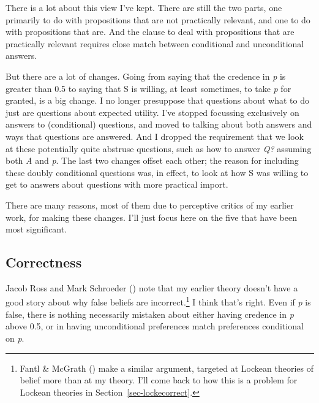 \documentclass[
  12pt,
  letterpaper,
]{scrbook}
\begin{document}
There is a lot about this view I've kept. There are still the two parts,
one primarily to do with propositions that are not practically relevant,
and one to do with propositions that are. And the clause to deal with
propositions that are practically relevant requires close match between
conditional and unconditional answers.

But there are a lot of changes. Going from saying that the credence in
\emph{p} is greater than 0.5 to saying that S is willing, at least
sometimes, to take \emph{p} for granted, is a big change. I no longer
presuppose that questions about what to do just are questions about
expected utility. I've stopped focussing exclusively on answers to
(conditional) questions, and moved to talking about both answers and
ways that questions are answered. And I dropped the requirement that we
look at these potentially quite abstruse questions, such as how to
answer \emph{Q?} assuming both \emph{A} and \emph{p}. The last two
changes offset each other; the reason for including these doubly
conditional questions was, in effect, to look at how S was willing to
get to answers about questions with more practical import.

There are many reasons, most of them due to perceptive critics of my
earlier work, for making these changes. I'll just focus here on the five
that have been most significant.

\subsection{Correctness}\label{sec-mecorrect}

Jacob Ross and Mark Schroeder ()
note that my earlier theory doesn't have a good story about why false
beliefs are incorrect.\footnote{Fantl \& McGrath
  () make a similar argument,
  targeted at Lockean theories of belief more than at my theory. I'll
  come back to how this is a problem for Lockean theories in
  Section~\ref{sec-lockecorrect}.} I think that's right. Even if
\emph{p} is false, there is nothing necessarily mistaken about either
having credence in \emph{p} above 0.5, or in having unconditional
preferences match preferences conditional on \emph{p}.
\end{document}
